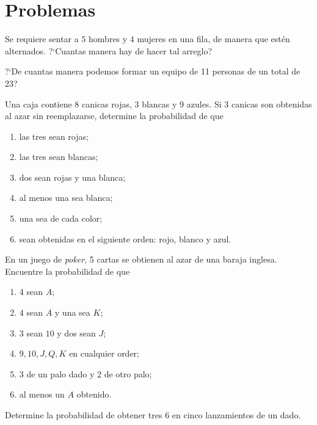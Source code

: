 \section*{Problemas}
{}
\begin{problema}
	\label{solved:1.22}
	Se requiere sentar a $5$ hombres y $4$ mujeres en una fila, de manera que estén alternados. ?`Cuantas manera hay de hacer tal arreglo?
\end{problema}

{}
\begin{problema}
	\label{solved:1.29}
	?`De cuantas manera podemos formar un equipo de 11 personas de un total de 23?
\end{problema}

{}
\begin{problema}
	\label{solved:1.35}
	Una caja contiene $8$ canicas rojas, $3$ blancas y $9$ azules. Si 3 canicas son obtenidas al azar sin reemplazarse, determine la probabilidad de que
	\begin{enumerate}
		\item las tres sean rojas; 
		\item las tres sean blancas; 
		\item dos sean rojas y una blanca; 
		\item al menos una sea blanca; 
		\item una sea de cada color; 
		\item sean obtenidas en el siguiente orden: rojo, blanco y azul.
	\end{enumerate}
	
\end{problema}

{}
\begin{problema}
	\label{solved:1.36}
	En un juego de \emph{poker}, 5 cartas se obtienen al azar de una baraja inglesa. Encuentre la probabilidad de que
	\begin{enumerate}
		\item 4 sean $A$; 
		\item 4 sean $A$ y una sea $K$; 
		\item 3 sean $10$ y dos sean $J$; 
		\item $9,10,J,Q,K$ en cualquier order; 
		\item 3 de un palo dado y 2 de otro palo; 
		\item al menos un $A$ obtenido.
	\end{enumerate}
	
\end{problema}

{}
\begin{problema}
	\label{solved:1.37}
	Determine la probabilidad de obtener tres $6$ en cinco lanzamientos de un dado.
\end{problema}

%
